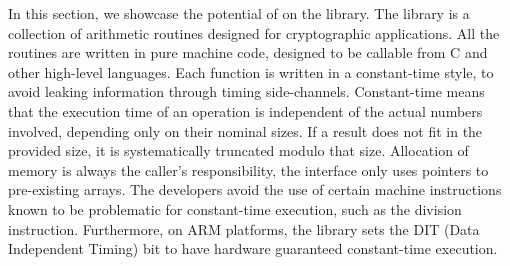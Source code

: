In this section, we showcase the potential of \timesec{} on the \bignum{} library.
%
%
The \bignum{} library is a collection of arithmetic routines designed for cryptographic applications.
All the routines are written in pure machine code, designed to be callable from C and other high-level languages.
Each function is written in a constant-time style, to avoid leaking information through timing side-channels.
Constant-time means that the execution time of an \bignum{} operation is independent of the actual numbers involved,
depending only on their nominal sizes.
If a result does not fit in the provided size, it is systematically truncated modulo that size.
Allocation of memory is always the caller's responsibility, the \bignum{} interface only uses pointers to pre-existing arrays.
The developers avoid the use of certain machine instructions known to be problematic for constant-time execution, such as the division instruction.
Furthermore, on ARM platforms, the library sets the DIT (Data Independent Timing) bit to have hardware guaranteed constant-time execution.

